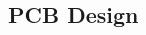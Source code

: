 
\vspace*{8.5cm}

\begin{flushright}
	\section{PCB Design}
\end{flushright}



\begin{multicols}{2}
		
	
	
	
		
	
	
\end{multicols}